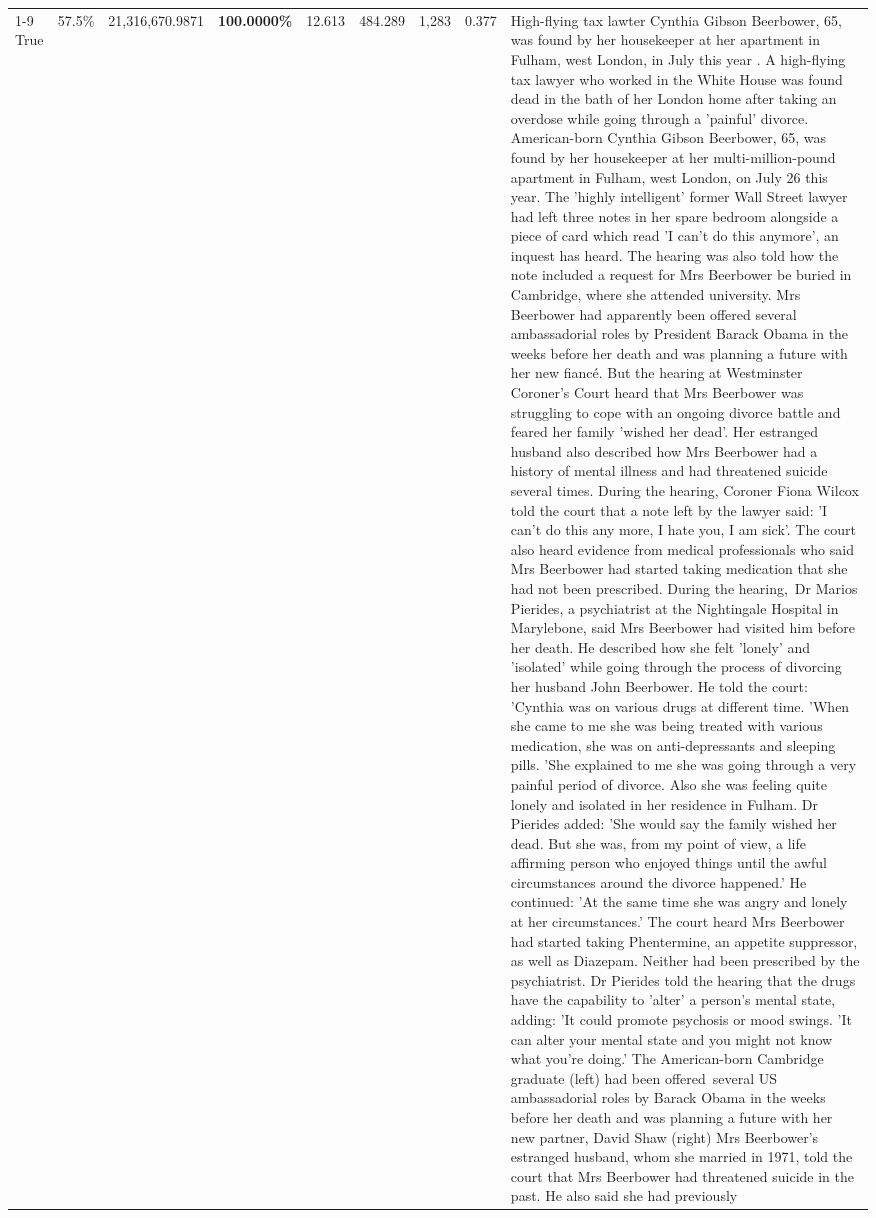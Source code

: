 \begin{table}[H]
\begin{tabular}{lllrlllll}
\cline{1-9}
True & 57.5\% & 21,316,670.9871 & \bfseries \color{red} 100.0000\% & 12.613 & 484.289 & 1,283 & 0.377 & High-flying tax lawter Cynthia Gibson Beerbower, 65, was found by her housekeeper at her apartment in Fulham, west London, in July this year . A high-flying tax lawyer who worked in the White House was found dead in the bath of her London home after taking an overdose while going through a 'painful' divorce. American-born Cynthia Gibson Beerbower, 65, was found by her housekeeper at her multi-million-pound apartment in Fulham, west London, on July 26 this year. The 'highly intelligent' former Wall Street lawyer had left three notes in her spare bedroom alongside a piece of card which read 'I can't do this anymore', an inquest has heard. The hearing was also told how the note included a request for Mrs Beerbower be buried in Cambridge, where she attended university. Mrs Beerbower had apparently been offered several ambassadorial roles by President Barack Obama in the weeks before her death and was planning a future with her new fiancé. But the hearing at Westminster Coroner's Court heard that Mrs Beerbower was struggling to cope with an ongoing divorce battle and feared her family 'wished her dead'. Her estranged husband also described how Mrs Beerbower had a history of mental illness and had threatened suicide several times. During the hearing, Coroner Fiona Wilcox told the court that a note left by the lawyer said: 'I can't do this any more, I hate you, I am sick'. The court also heard evidence from medical professionals who said Mrs Beerbower had started taking medication that she had not been prescribed. During the hearing, Dr Marios Pierides, a psychiatrist at the Nightingale Hospital in Marylebone, said Mrs Beerbower had visited him before her death. He described how she felt 'lonely' and 'isolated' while going through the process of divorcing her husband John Beerbower. He told the court: 'Cynthia was on various drugs at different time. 'When she came to me she was being treated with various medication, she was on anti-depressants and sleeping pills. 'She explained to me she was going through a very painful period of divorce. Also she was feeling quite lonely and isolated in her residence in Fulham. Dr Pierides added: 'She would say the family wished her dead. But she was, from my point of view, a life affirming person who enjoyed things until the awful circumstances around the divorce happened.' He continued: 'At the same time she was angry and lonely at her circumstances.' The court heard Mrs Beerbower had started taking Phentermine, an appetite suppressor, as well as Diazepam. Neither had been prescribed by the psychiatrist. Dr Pierides told the hearing that the drugs have the capability to 'alter' a person's mental state, adding: 'It could promote psychosis or mood swings. 'It can alter your mental state and you might not know what you're doing.' The American-born Cambridge graduate (left) had been offered several US ambassadorial roles by Barack Obama in the weeks before her death and was planning a future with her new partner, David Shaw (right) Mrs Beerbower's estranged husband, whom she married in 1971, told the court that Mrs Beerbower had threatened suicide in the past. He also said she had previously 
\end{tabular}
\end{table}
